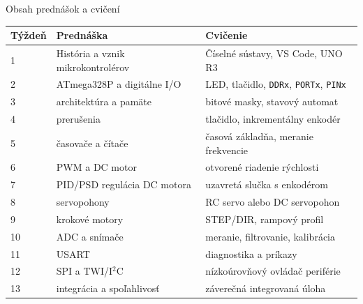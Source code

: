 \begin{frame}{Obsah prednášok a cvičení}
\scriptsize
\begin{tabular}{p{}p{}p{}}
\toprule
Týždeň & Prednáška & Cvičenie \\
\midrule
1 & História a vznik mikrokontrolérov & Číselné sústavy, VS Code, UNO R3 \\
2 & ATmega328P a digitálne I/O & LED, tlačidlo, \texttt{DDRx}, \texttt{PORTx}, \texttt{PINx} \\
3 & architektúra a pamäte & bitové masky, stavový automat \\
4 & prerušenia & tlačidlo, inkrementálny enkodér \\
5 & časovače a čítače & časová základňa, meranie frekvencie \\
6 & PWM a DC motor & otvorené riadenie rýchlosti \\
7 & PID/PSD regulácia DC motora & uzavretá slučka s enkodérom \\
8 & servopohony & RC servo alebo DC servopohon \\
9 & krokové motory & STEP/DIR, rampový profil \\
10 & ADC a snímače & meranie, filtrovanie, kalibrácia \\
11 & USART & diagnostika a príkazy \\
12 & SPI a TWI/I$^2$C & nízkoúrovňový ovládač periférie \\
13 & integrácia a spoľahlivosť & záverečná integrovaná úloha \\
\bottomrule
\end{tabular}
\end{frame}


